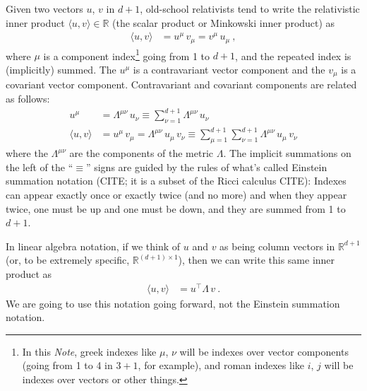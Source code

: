 \documentclass{article}
\newcommand{\inner}[2]{\langle{#1},{#2}\rangle}
\newcommand{\documentname}{\textsl{Note}}
\begin{document}
Given two vectors $u$, $v$ in $d+1$, old-school relativists tend to write the relativistic inner product $\inner{u}{v}\in\mathbb{R}$ (the scalar product or Minkowski inner product) as
\begin{align}
    \inner{u}{v} &= u^\mu\,v_\mu = v^\mu\,u_\mu ~,
\end{align}
where $\mu$ is a component index\footnote{In this \documentname{}, greek indexes like $\mu$, $\nu$ will be indexes over vector components (going from 1 to 4 in $3+1$, for example), and roman indexes like $i$, $j$ will be indexes over vectors or other things.} going from 1 to $d+1$, and the repeated index is (implicitly) summed.
The $u^\mu$ is a contravariant vector component and the $v_\mu$ is a covariant vector component.
Contravariant and covariant components are related as follows:
\begin{align}
    u^\mu &= \Lambda^{\mu\nu}\,u_\nu \equiv \sum_{\nu=1}^{d+1} \Lambda^{\mu\nu}\,u_\nu
    \\
    \inner{u}{v} &= u^\mu\,v_\mu = \Lambda^{\mu\nu}\,u_\mu\,v_\nu \equiv \sum_{\mu=1}^{d+1}\sum_{\nu=1}^{d+1} \Lambda^{\mu\nu}\,u_\mu\,v_\nu
\end{align}
where the $\Lambda^{\mu\nu}$ are the components of the metric $\Lambda$.
The implicit summations on the left of the ``$\equiv$'' signs are guided by the rules of what's called Einstein summation notation (CITE; it is a subset of the Ricci calculus CITE): Indexes can appear exactly once or exactly twice (and no more) and when they appear twice, one must be up and one must be down, and they are summed from 1 to $d+1$.

In linear algebra notation, if we think of $u$ and $v$ as being column vectors in $\mathbb{R}^{d+1}$ (or, to be extremely specific, $\mathbb{R}^{(d+1)\times 1}$), then we can write this same inner product as
\begin{align}
    \inner{u}{v} &= u^\top\Lambda\,v ~.
\end{align}
We are going to use this notation going forward, not the Einstein summation notation.
\end{document}
